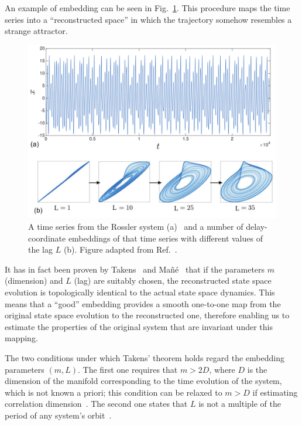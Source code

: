 An example of embedding can be seen in Fig.~\ref{fig: rossler embedding}.
This procedure maps the time series into a ``reconstructed space'' in which the trajectory
somehow resembles a strange attractor.

\begin{figure}[!htbp]
    \centering
    \includegraphics[width=\linewidth]{images/rossler_embedding.png}
    \caption{
    A time series from the Rossler system (a)~\cite{rossler1977continuous}
    and a number of delay-coordinate embeddings of that time series with different values of the lag $L$ (b).
    Figure adapted from Ref.~\cite{ref:bradley2015nonlinear}.}\label{fig: rossler embedding}
\end{figure}

It has in fact been proven by Takens~\cite{ref:takens2006detecting} and Ma{\~n}{\'e}~\cite{ref:mane2006dimension} that
if the parameters $m$ (dimension) and $L$ (lag) are suitably chosen,
the reconstructed state space evolution is topologically identical to the actual state space dynamics.
This means that a ``good” embedding provides a smooth one-to-one map from the
original state space evolution to the reconstructed one, therefore enabling us to estimate the
properties of the original system that are invariant under this mapping.

The two conditions under which Takens' theorem holds regard the embedding parameters $(m,L)$.
The first one requires that $m>2D$, where $D$ is the dimension of the manifold corresponding to the
time evolution of the system, which is not known a priori; this condition can be relaxed to $m>D$ if
estimating correlation dimension~\cite{ref:ding1993estimating}.
The second one states that $L$ is not a multiple of the period of any system's orbit~\cite{ref:grassberger1991nonlinear}.

